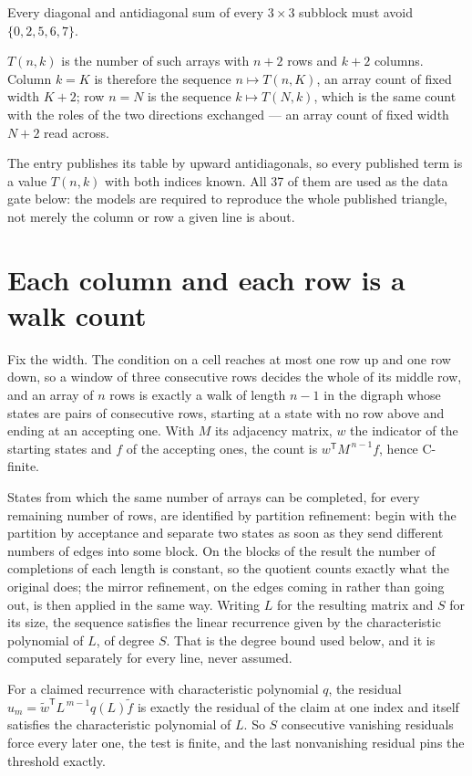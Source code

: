 \documentclass[11pt]{article}
\theoremstyle{definition}
\begin{document}
Every diagonal and antidiagonal sum of every $3\times3$ subblock must avoid $\{0, 2, 5, 6, 7\}$.

$T(n,k)$ is the number of such arrays with $n + 2$ rows and $k + 2$ columns. Column $k = K$ is therefore the sequence $n \mapsto T(n,K)$, an array count of fixed width $K + 2$; row $n = N$ is the sequence $k \mapsto T(N,k)$, which is the same count with the roles of the two directions exchanged --- an array count of fixed width $N + 2$ read across.

The entry publishes its table by upward antidiagonals, so every published term is a value $T(n,k)$ with both indices known. All 37 of them are used as the data gate below: the models are required to reproduce the whole published triangle, not merely the column or row a given line is about.

\section{Each column and each row is a walk count}

Fix the width. The condition on a cell reaches at most one row up and one row down, so a window of three consecutive rows decides the whole of its middle row, and an array of $n$ rows is exactly a walk of length $n-1$ in the digraph whose states are pairs of consecutive rows, starting at a state with no row above and ending at an accepting one. With $M$ its adjacency matrix, $w$ the indicator of the starting states and $f$ of the accepting ones, the count is $w^{\mathsf T}M^{\,n-1}f$, hence C-finite.

States from which the same number of arrays can be completed, for every remaining number of rows, are identified by partition refinement: begin with the partition by acceptance and separate two states as soon as they send different numbers of edges into some block. On the blocks of the result the number of completions of each length is constant, so the quotient counts exactly what the original does; the mirror refinement, on the edges coming in rather than going out, is then applied in the same way. Writing $L$ for the resulting matrix and $S$ for its size, the sequence satisfies the linear recurrence given by the characteristic polynomial of $L$, of degree $S$. That is the degree bound used below, and it is computed separately for every line, never assumed.

For a claimed recurrence with characteristic polynomial $q$, the residual $u_m = \tilde w^{\mathsf T}L^{\,m-1}q(L)\tilde f$ is exactly the residual of the claim at one index and itself satisfies the characteristic polynomial of $L$. So $S$ consecutive vanishing residuals force every later one, the test is finite, and the last nonvanishing residual pins the threshold exactly.
\end{document}

